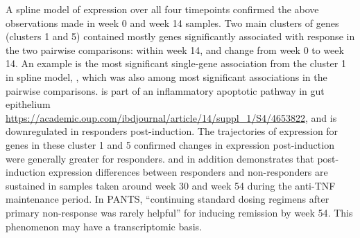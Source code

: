 \begin{outline}
A spline model of expression over all four timepoints confirmed the above observations made in week 0 and week 14 samples.
Two main clusters of genes (clusters 1 and 5) contained mostly genes significantly associated with response in the two pairwise comparisons: within week 14, and change from week 0 to week 14.
An example is the most significant single-gene association from the cluster 1 in spline model, , 
which was also among most significant associations in the pairwise comparisons.
 is part of an inflammatory apoptotic pathway in gut epithelium \url{https://academic.oup.com/ibdjournal/article/14/suppl_1/S4/4653822}, 
and is downregulated in responders post-induction.
The trajectories of expression for genes in these cluster 1 and 5 confirmed changes in expression post-induction were generally greater for responders.
and in addition demonstrates that post-induction expression differences between responders and non-responders are sustained
in samples taken around week 30 and week 54 during the anti-\gls{TNF} maintenance period.
In \gls{PANTS}, \enquote{continuing standard dosing regimens after primary non-response was rarely helpful} for inducing remission by week 54\autocite{kennedy2019PredictorsAntiTNFTreatment}.
This phenomenon may have a transcriptomic basis.


\end{outline}
